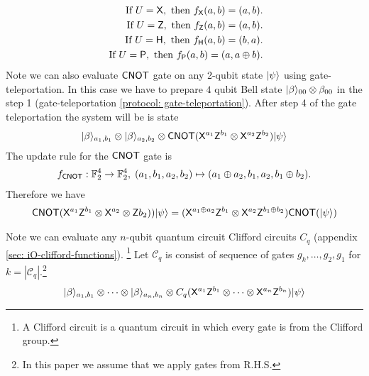 \begin{equation*}
\begin{aligned}
\mbox{ If } U={\sf X},  \mbox{ then } f_{\sf X}(a,b)=(a,b).\\
\mbox{ If } U={\sf Z},  \mbox{ then } f_{\sf Z}(a,b)=(a,b).\\
\mbox{ If } U={\sf H},  \mbox{ then } f_{\sf H}(a,b)=(b,a).\\
\mbox{ If } U={\sf P},  \mbox{ then } f_ {\sf P}(a,b)=(a,a\oplus b).\\
\end{aligned}
\end{equation*}
Note we can also evaluate ${\sf CNOT}$ gate on any 2-qubit state ${\lvert}\psi\rangle$ using gate-teleportation. In this case we have to prepare $4$ qubit Bell state ${\lvert}\beta\rangle_{00}\otimes \beta_{00}$ in the step 1 (gate-teleportation \ref{protocol: gate-teleportation}). After step 4 of the gate teleportation the system will be is state
\begin{equation*}
\begin{aligned}
 {\lvert}\beta\rangle_{a_1,b_1}\otimes {\lvert}\beta\rangle_{a_2,b_2} \otimes {\sf CNOT}({\sf X}^{a_1}{\sf Z}^{b_1}\otimes {\sf X}^{a_2}{\sf Z}^{b_2}){\lvert}\psi\rangle
\end{aligned}
\end{equation*}
The update rule for the ${\sf CNOT}$ gate is
\begin{equation*}
\begin{aligned}
f_{{\sf CNOT}}:\mathbb{F}_2^4\rightarrow \mathbb{F}_2^4, \; (a_1,b_1,a_2,b_2)\mapsto (a_1\oplus a_2,b_1,a_2, b_1\oplus b_2).
\end{aligned}
\end{equation*}
Therefore we have 
\begin{equation*}
\begin{aligned}
  {\sf CNOT}({\sf X}^{a_1}{\sf Z}^{b_1}\otimes {\sf X}^{a_2}\otimes {\sf Z}{b_2})){\lvert}\psi\rangle= ({\sf X}^{a_1\oplus a_2}{\sf Z}^{b_1}\otimes {\sf X}^{a_2} {\sf Z}^{b_1\oplus b_2}){\sf CNOT}({\lvert}\psi\rangle)
 \end{aligned}
\end{equation*}
	
Note we can evaluate any $n$-qubit quantum circuit  Clifford circuits $C_q$ (appendix \ref{sec: iO-clifford-functions}). \footnote{A Clifford circuit is a quantum circuit in which every gate is from the Clifford group.} Let $\mathcal{C}_q$ is consist of sequence of gates $g_k,\ldots,g_2,g_1$ for $k=|\mathcal{C}_q|.$\footnote{In this paper we assume that we apply gates from R.H.S.} 
\begin{equation}
\label{relation:update}
\begin{aligned}
 {\lvert}\beta\rangle_{a_1,b_1}\otimes \cdots \otimes {\lvert}\beta\rangle_{a_n,b_n} \otimes C_q({\sf X}^{a_1}{\sf Z}^{b_1}\otimes \cdots \otimes{\sf X}^{a_n}{\sf Z}^{b_n}){\lvert}\psi\rangle
\end{aligned}
\end{equation}

